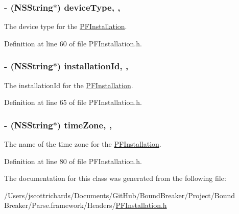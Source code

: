 \subsubsection[{device\+Type}]{\setlength{\rightskip}{0pt plus 5cm}-\/ (N\+S\+String$\ast$) device\+Type\hspace{0.3cm}{\ttfamily [read]}, {\ttfamily [nonatomic]}, {\ttfamily [strong]}}\label{interface_p_f_installation_afac8d2521c0fd031e204c5642ce271a6}
The device type for the {\ttfamily \hyperlink{interface_p_f_installation}{P\+F\+Installation}}. 

Definition at line 60 of file P\+F\+Installation.\+h.

\hypertarget{interface_p_f_installation_aba5ea4cb6705ac365a6a33fcf775deb8}{}
\subsubsection[{installation\+Id}]{\setlength{\rightskip}{0pt plus 5cm}-\/ (N\+S\+String$\ast$) installation\+Id\hspace{0.3cm}{\ttfamily [read]}, {\ttfamily [nonatomic]}, {\ttfamily [strong]}}\label{interface_p_f_installation_aba5ea4cb6705ac365a6a33fcf775deb8}
The installation\+Id for the {\ttfamily \hyperlink{interface_p_f_installation}{P\+F\+Installation}}. 

Definition at line 65 of file P\+F\+Installation.\+h.

\hypertarget{interface_p_f_installation_adb6faa1119a0a6155940bf6837037bff}{}
\subsubsection[{time\+Zone}]{\setlength{\rightskip}{0pt plus 5cm}-\/ (N\+S\+String$\ast$) time\+Zone\hspace{0.3cm}{\ttfamily [read]}, {\ttfamily [nonatomic]}, {\ttfamily [strong]}}\label{interface_p_f_installation_adb6faa1119a0a6155940bf6837037bff}
The name of the time zone for the {\ttfamily \hyperlink{interface_p_f_installation}{P\+F\+Installation}}. 

Definition at line 80 of file P\+F\+Installation.\+h.



The documentation for this class was generated from the following file\+:\begin{DoxyCompactItemize}
\item 
/\+Users/jscottrichards/\+Documents/\+Git\+Hub/\+Bound\+Breaker/\+Project/\+Bound Breaker/\+Parse.\+framework/\+Headers/\hyperlink{_p_f_installation_8h}{P\+F\+Installation.\+h}\end{DoxyCompactItemize}
